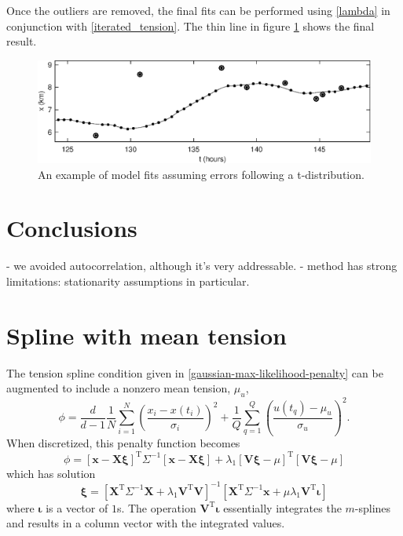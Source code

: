\documentclass[10pt,journal]{IEEEtran}
\begin{document}
Once the outliers are removed, the final fits can be performed using \ref{lambda} in conjunction with \ref{iterated_tension}. The thin line in figure \ref{tdistributionfit} shows the final result.

\begin{figure}[t]
  \centerline{\includegraphics[width=39pc,angle=0]{tdistributionfit}}
  
  \caption{An example of model fits assuming errors following a t-distribution.}
  \label{tdistributionfit}
\end{figure}


\section{Conclusions}

- we avoided autocorrelation, although it's very addressable.
- method has strong limitations: stationarity assumptions in particular.

%
\appendices
%

\section{Spline with mean tension}
\label{mean_tension}

The tension spline condition given in \ref{gaussian-max-likelihood-penalty} can be augmented to include a nonzero mean tension, $\mu_u$,
\begin{equation}
\phi =  \frac{d}{d-1} \frac{1}{N} \sum^N _{i=1}\left( \frac{x_i - x(t_i)}{\sigma_i} \right)^2 + \frac{1}{Q} \sum^{Q}_{q=1}  \left(  \frac{u(t_q)-\mu_u}{\sigma_u} \right)^2.
\end{equation}
When discretized, this penalty function becomes
\begin{equation}
\phi = \left[ \mathbf{x} - \mathbf{X} \mathbf{\xi} \right]^{\textrm{T}} \Sigma^{-1} \left[ \mathbf{x} - \mathbf{X} \mathbf{\xi}\right]
+ \lambda_1 \left[\mathbf{V}\mathbf{\xi} - \mu \right]^{\textrm{T}} \left[ \mathbf{V}\mathbf{\xi} - \mu \right]
\end{equation}
which has solution
\begin{equation}
\mathbf{\xi} = \left[ \mathbf{X}^{\textrm{T}} \Sigma^{-1} \mathbf{X} + \lambda_1 \mathbf{V}^{\textrm{T}} \mathbf{V} \right]^{-1}   \left[ \mathbf{X}^{\textrm{T}} \Sigma^{-1} \mathbf{x} +  \mu \lambda_1 \mathbf{V}^{\textrm{T}} \mathbf{\iota} \right]
\end{equation}
where $\mathbf{\iota}$ is a vector of $1$s. The operation $\mathbf{V}^{\textrm{T}} \mathbf{\iota}$ essentially integrates the $m$-splines and results in a column vector with the integrated values.
\end{document}
